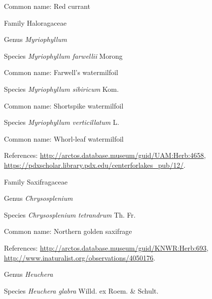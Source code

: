 \documentclass[9pt, article]{memoir}
\begin{document}
\begin{multicols}{2}
Common name: Red currant

\vspace{6pt}\noindent\hspace{24pt}Family Haloragaceae


\vspace{6pt}\noindent\hspace{30pt}Genus \textit{Myriophyllum}


\vspace{6pt}\noindent\hspace{36pt}Species \textit{Myriophyllum farwellii} Morong


Common name: Farwell's watermilfoil

\vspace{6pt}\noindent\hspace{36pt}Species \textit{Myriophyllum sibiricum} Kom.


Common name: Shortspike watermilfoil

\vspace{6pt}\noindent\hspace{36pt}Species \textit{Myriophyllum verticillatum} L.


Common name: Whorl-leaf watermilfoil

References: 
\url{http://arctos.database.museum/guid/UAM:Herb:4658}, 
\url{https://pdxscholar.library.pdx.edu/centerforlakes_pub/12/}.

\vspace{6pt}\noindent\hspace{24pt}Family Saxifragaceae


\vspace{6pt}\noindent\hspace{30pt}Genus \textit{Chrysosplenium}


\vspace{6pt}\noindent\hspace{36pt}Species \textit{Chrysosplenium tetrandrum} Th. Fr.


Common name: Northern golden saxifrage

References: 
\url{http://arctos.database.museum/guid/KNWR:Herb:693}, 
\url{http://www.inaturalist.org/observations/4050176}.

\vspace{6pt}\noindent\hspace{30pt}Genus \textit{Heuchera}


\vspace{6pt}\noindent\hspace{36pt}Species \textit{Heuchera glabra} Willd. ex Roem. \& Schult.



\end{multicols}
\end{document}
